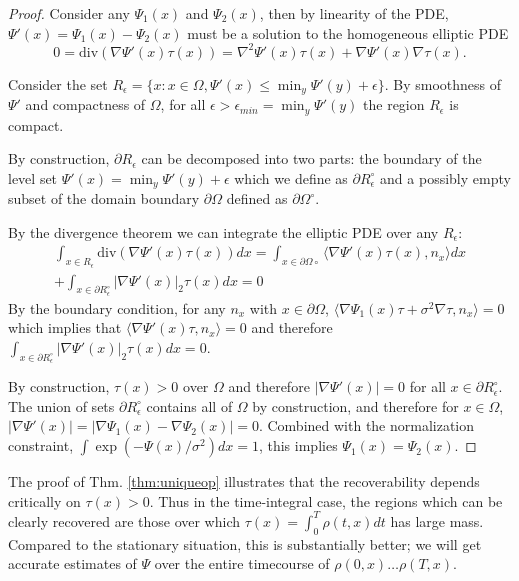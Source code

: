 \documentclass{article}
\begin{document}
\begin{proof}
Consider any $\Psi_1(x)$ and $\Psi_2(x)$, then by linearity of the PDE, $\Psi'(x)=\Psi_1(x) - \Psi_2(x)$ must be a solution to the homogeneous elliptic PDE
\[0 = \text{div}(\nabla \Psi'(x) \tau(x))=\nabla^2 \Psi'(x) \tau(x) + \nabla \Psi'(x) \nabla \tau(x).\]

Consider the set $R_\epsilon=\{x:x\in\Omega, \Psi'(x)\leq \min_y \Psi'(y) + \epsilon\}$. By smoothness of $\Psi'$ and compactness of $\Omega$, for all $\epsilon > \epsilon_{min} = \min_y \Psi'(y)$ the region $R_\epsilon$ is compact.

By construction, $\partial R_{\epsilon}$ can be decomposed into two parts: the boundary of the level set $\Psi'(x) = \min_y \Psi'(y)+\epsilon$ which we define as $\partial R_{\epsilon}^\circ$ and a possibly empty subset of the domain boundary $\partial \Omega$ defined as $\partial \Omega^\circ$.

By the divergence theorem we can integrate the elliptic PDE over any $R_{\epsilon}$:
\begin{align*}
\int_{x\in R_\epsilon} \text{div}(\nabla \Psi'(x)\tau(x))dx = \int_{x\in \partial \Omega\circ} \langle \nabla \Psi'(x) \tau(x) , n_x \rangle dx \\
+ \int_{x\in \partial R_\epsilon^\circ} |\nabla\Psi'(x)|_2\tau(x) dx = 0
\end{align*}
By the boundary condition, for any $n_x$ with $x\in\partial \Omega$, $\langle \nabla \Psi_1(x) \tau + \sigma^2\nabla \tau , n_x \rangle = 0$ which implies that $\langle \nabla \Psi'(x) \tau , n_x \rangle = 0$ and therefore $\int_{x\in \partial R_\epsilon^\circ} |\nabla\Psi'(x)|_2\tau(x) dx = 0$.

By construction, $\tau(x)>0$ over $\Omega$ and therefore $|\nabla \Psi'(x)| = 0$ for all $x \in \partial R_{\epsilon}^\circ$. The union of sets $\partial R_{\epsilon}^\circ$ contains all of $\Omega$ by construction, and therefore for $x\in \Omega$, $|\nabla \Psi'(x)| = |\nabla \Psi_1(x) - \nabla \Psi_2(x)| = 0$.
Combined with the normalization constraint, $\int \exp(-\Psi(x)/\sigma^2) dx = 1$, this implies $\Psi_1(x) = \Psi_2(x)$.
\end{proof}

The proof of Thm. \ref{thm:uniqueop} illustrates that the recoverability depends critically on $\tau(x)>0$. Thus in the time-integral case, the regions which can be clearly recovered are those over which  $\tau(x)=\int_0^T\rho(t,x)dt$ has large mass. Compared to the stationary situation, this is substantially better; we will get accurate estimates of $\Psi$ over the entire timecourse of $\rho(0,x) \hdots \rho(T,x)$.
\end{document}
